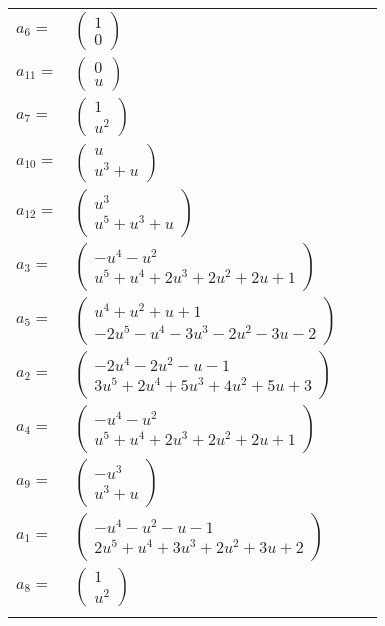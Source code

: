 \documentclass[1p]{elsarticle_modified}
\theoremstyle{definition}
\begin{document}
\begin{tabular}{m{7pt} m{180pt} m{7pt} m{180pt} }
\flushright $a_{6}=$&$\begin{pmatrix}1\\0\end{pmatrix}$ \\
\flushright $a_{11}=$&$\begin{pmatrix}0\\u\end{pmatrix}$ \\
\flushright $a_{7}=$&$\begin{pmatrix}1\\u^2\end{pmatrix}$ \\
\flushright $a_{10}=$&$\begin{pmatrix}u\\u^3+u\end{pmatrix}$ \\
\flushright $a_{12}=$&$\begin{pmatrix}u^3\\u^5+u^3+u\end{pmatrix}$ \\
\flushright $a_{3}=$&$\begin{pmatrix}- u^4- u^2\\u^5+u^4+2 u^3+2 u^2+2 u+1\end{pmatrix}$ \\
\flushright $a_{5}=$&$\begin{pmatrix}u^4+u^2+u+1\\-2 u^5- u^4-3 u^3-2 u^2-3 u-2\end{pmatrix}$ \\
\flushright $a_{2}=$&$\begin{pmatrix}-2 u^4-2 u^2- u-1\\3 u^5+2 u^4+5 u^3+4 u^2+5 u+3\end{pmatrix}$ \\
\flushright $a_{4}=$&$\begin{pmatrix}- u^4- u^2\\u^5+u^4+2 u^3+2 u^2+2 u+1\end{pmatrix}$ \\
\flushright $a_{9}=$&$\begin{pmatrix}- u^3\\u^3+u\end{pmatrix}$ \\
\flushright $a_{1}=$&$\begin{pmatrix}- u^4- u^2- u-1\\2 u^5+u^4+3 u^3+2 u^2+3 u+2\end{pmatrix}$ \\
\flushright $a_{8}=$&$\begin{pmatrix}1\\u^2\end{pmatrix}$\\&\end{tabular}
\end{document}
